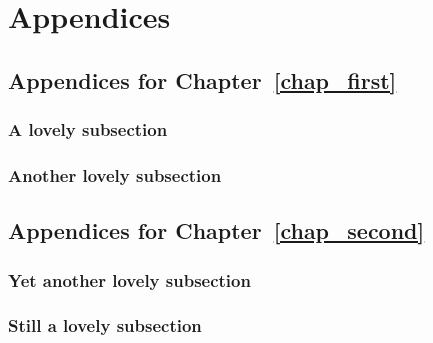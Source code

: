 \chapter{Appendices}

\section{Appendices for Chapter~\ref{chap_first}}
\subsection{ A lovely subsection}
\lipsum[20-21]
\subsection{ Another lovely subsection}
\lipsum[21-22]

\section{Appendices for Chapter~\ref{chap_second}}
\subsection{Yet another lovely subsection}
\lipsum[23-24]
\subsection{Still a lovely subsection}
\lipsum[25-26]
